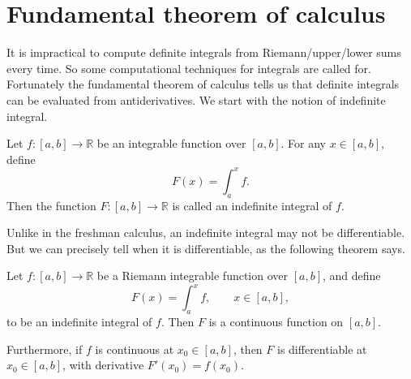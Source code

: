 \section{Fundamental theorem of calculus}
\label{sec:FTC}

It is impractical to compute definite integrals from Riemann/upper/lower sums every time.
So some computational techniques for integrals are called for.
Fortunately the fundamental theorem of calculus tells us that definite integrals can be evaluated from antiderivatives.
We start with the notion of indefinite integral.

\begin{defn}
  Let $f : [a,b] \to \mathbb{R}$ be an integrable function over $[a,b]$.
  For any $x \in [a,b]$, define
  \[
    F(x) = \int_a^x f.
  \]
  Then the function $F : [a,b] \to \mathbb{R}$ is called an \textsf{indefinite integral} of $f$.
\end{defn}

Unlike in the freshman calculus, an indefinite integral may not be differentiable.
But we can precisely tell when it is differentiable, as the following theorem says.

\begin{thm}
  \label{thm:FTC-1}
  Let $f : [a,b] \to \mathbb{R}$ be a Riemann integrable function over $[a,b]$, and define
  \[
    F(x) = \int_a^x f, \qquad x \in [a,b],
  \]
  to be an indefinite integral of $f$.  Then $F$ is a continuous function on $[a,b]$.

  Furthermore, if $f$ is continuous at $x_0 \in [a,b]$, then $F$ is differentiable at $x_0 \in [a,b]$, with derivative $F'(x_0) = f(x_0)$.
\end{thm}

